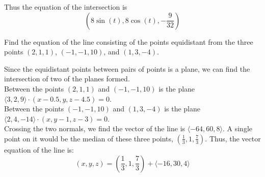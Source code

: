 \documentclass[12pt]{exam}
\begin{document}
\begin{questions}
\begin{solution}
		Thus the equation of the intersection is 
		\[\boxed{(8\sin(t), 8\cos(t), -\frac{9}{32})} \tag*{\qed}\]
	\end{solution}
\clearpage
\question Find the equation of the line consisting of the points equidistant 
	from the three points $(2, 1, 1)$, $(-1, -1, 10)$, and $(1, 3, -4)$.
	\begin{solution}
		Since the equidistant points between pairs of points is a plane, we can find the intersection of two of the planes formed. \\
		Between the points $(2,1,1)$ and $(-1,-1,10)$ is the plane $\langle 3, 2, 9 \rangle \cdot (x - 0.5, y, z - 4.5) = 0$. \\
		Between the points $(-1, -1, 10)$ and $(1, 3, -4)$ is the plane $\langle 2, 4, -14 \rangle \cdot (x, y - 1, z - 3) = 0$. \\
		Crossing the two normals, we find the vector of the line is $ \langle -64, 60, 8 \rangle $. A single point on it would be the median of these three points, $(\frac{1}{3}, 1, \frac{7}{3})$. Thus, the vector equation of the line is:
		\[ \boxed{(x, y, z) = \left(\frac{1}{3}, 1, \frac{7}{3}\right) + \langle -16, 30, 4 \rangle} \tag*{\qed}\]
	\end{solution}
\clearpage
\question 
\end{questions}
\end{document}
